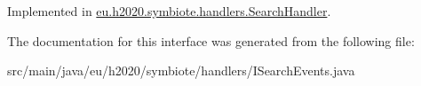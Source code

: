 Implemented in \hyperlink{classeu_1_1h2020_1_1symbiote_1_1handlers_1_1SearchHandler_aa1657bbaf89181f753c550f70606ec4c}{eu.\+h2020.\+symbiote.\+handlers.\+Search\+Handler}.



The documentation for this interface was generated from the following file\+:\begin{DoxyCompactItemize}
\item 
src/main/java/eu/h2020/symbiote/handlers/I\+Search\+Events.\+java\end{DoxyCompactItemize}
